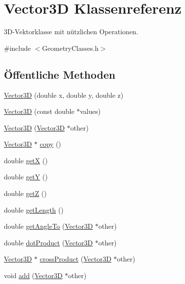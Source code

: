 \hypertarget{classVector3D}{\section{Vector3\-D Klassenreferenz}
\label{classVector3D}
}


3\-D-\/\-Vektorklasse mit nützlichen Operationen.  




{\ttfamily \#include $<$Geometry\-Classes.\-h$>$}

\subsection*{Öffentliche Methoden}
\begin{DoxyCompactItemize}
\item 
\hyperlink{classVector3D_abd851542da40b1168edcad11fa83b7c2}{Vector3\-D} (double x, double y, double z)
\item 
\hyperlink{classVector3D_abd023faf726edb3919c84fd8329a1f8f}{Vector3\-D} (const double $\ast$values)
\item 
\hyperlink{classVector3D_a010bd55f41a082eccb1a7f513db29e69}{Vector3\-D} (\hyperlink{classVector3D}{Vector3\-D} $\ast$other)
\item 
\hyperlink{classVector3D}{Vector3\-D} $\ast$ \hyperlink{classVector3D_a46dd0d9a849809a3857783102959e788}{copy} ()
\item 
double \hyperlink{classVector3D_aa9eaf29045bf32b95c5c7bcb2b8b68d7}{get\-X} ()
\item 
double \hyperlink{classVector3D_aa3ffff17b886274a58417dfe4bb4c4a2}{get\-Y} ()
\item 
double \hyperlink{classVector3D_ab0dcbf253ff78856eccb5ea74d080fc7}{get\-Z} ()
\item 
double \hyperlink{classVector3D_a2e3aa1d244483abcb1a8e48e47e79512}{get\-Length} ()
\item 
double \hyperlink{classVector3D_a4bf1dcea68296f2f38f3574242933153}{get\-Angle\-To} (\hyperlink{classVector3D}{Vector3\-D} $\ast$other)
\item 
double \hyperlink{classVector3D_a0808a8e6004a347d82f9214778b5968f}{dot\-Product} (\hyperlink{classVector3D}{Vector3\-D} $\ast$other)
\item 
\hyperlink{classVector3D}{Vector3\-D} $\ast$ \hyperlink{classVector3D_a482cd77ce44ea7dd71fd7a43cb7b1cf5}{cross\-Product} (\hyperlink{classVector3D}{Vector3\-D} $\ast$other)
\item 
void \hyperlink{classVector3D_a0d14ff1f789254ff90adc22628eb8347}{add} (\hyperlink{classVector3D}{Vector3\-D} $\ast$other)

\end{DoxyCompactItemize}
